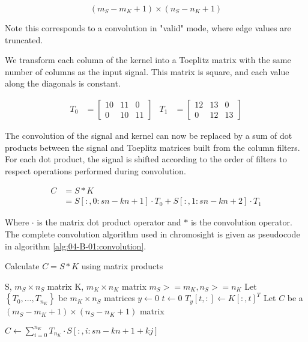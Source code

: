 \begin{equation}
    (m_S - m_K + 1) \times (n_S - n_K + 1)
\end{equation}

Note this corresponds to a convolution in "valid" mode, where edge values are truncated.

We transform each column of the kernel into a Toeplitz matrix with the same number of columns as the input signal. This matrix is square, and each value along the diagonals is constant.

\begin{align}
    T_0 &=
    \begin{bmatrix}
        10 & 11 & 0 \\
        0  & 10 & 11
    \end{bmatrix} &
    T_1 &=
    \begin{bmatrix}
        12 & 13 & 0 \\
        0  & 12 & 13
    \end{bmatrix}
\end{align}

The convolution of the signal and kernel can now be replaced by a sum of dot products between the signal and Toeplitz matrices built from the column filters. For each dot product, the signal is shifted according to the order of filters to respect operations performed during convolution.

\begin{align}
    C &= S * K \\
      &= S[:, 0: sn-kn+1] \cdot T_0 + S[:, 1:sn-kn+2] \cdot T_1
\end{align}

Where $\cdot$ is the matrix dot product operator and $*$ is the convolution operator.
The complete convolution algorithm used in chromosight is given as pseudocode in algorithm \ref{alg:04-B-01:convolution}.

\begin{algorithm}
\caption{Calculate $C = S * K$ using matrix products}
\label{alg:04-B-01:convolution}
\begin{algorithmic}
\REQUIRE S, $m_S \times n_S$ matrix
\REQUIRE K, $m_K \times n_K$ matrix
\ENSURE $m_S >= m_K, n_S >= n_K$
\STATE Let $\left\{T_0, ..., T_{n_K}\right\}$ be $m_K \times n_S$ matrices
\STATE $y \leftarrow 0$
    \STATE $t \leftarrow 0$
        \STATE $T_y[t, :] \leftarrow K[:, t]^T$
    \ENDWHILE
\ENDWHILE
\STATE Let $C$ be a $(m_S - m_K + 1) \times (n_S - n_K + 1)$ matrix

\STATE $C \leftarrow \sum_{i=0}^{n_K}{T_{n_K} \cdot S[: , i: sn-kn+1+kj]}$ 
\end{algorithmic}
\end{algorithm}
